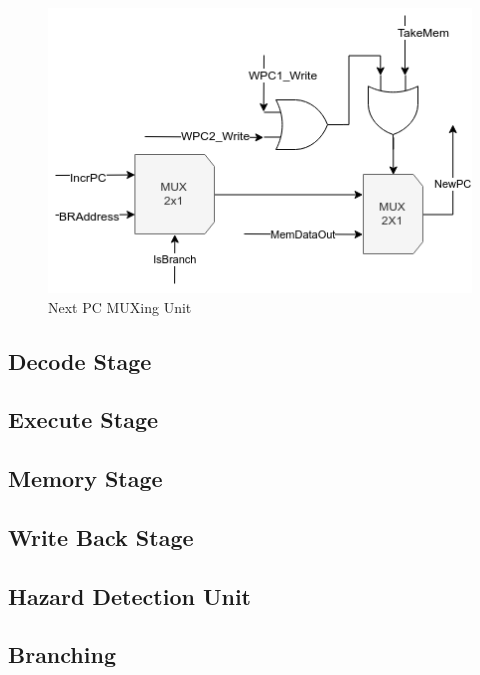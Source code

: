 \documentclass[12pt]{article}
\theoremstyle{plain}
\theoremstyle{definition}
\begin{document}
\begin{figure}
    \centering
    \includegraphics{Diagrams/fetch_predecode_npc.png}
    \caption{Next PC MUXing Unit}
    \label{fetch-predecode-npc}
\end{figure}

\subsection{Decode Stage}

\subsection{Execute Stage}

\subsection{Memory Stage}

\subsection{Write Back Stage}

\subsection{Hazard Detection Unit}

\subsection{Branching}


			
\end{document}
